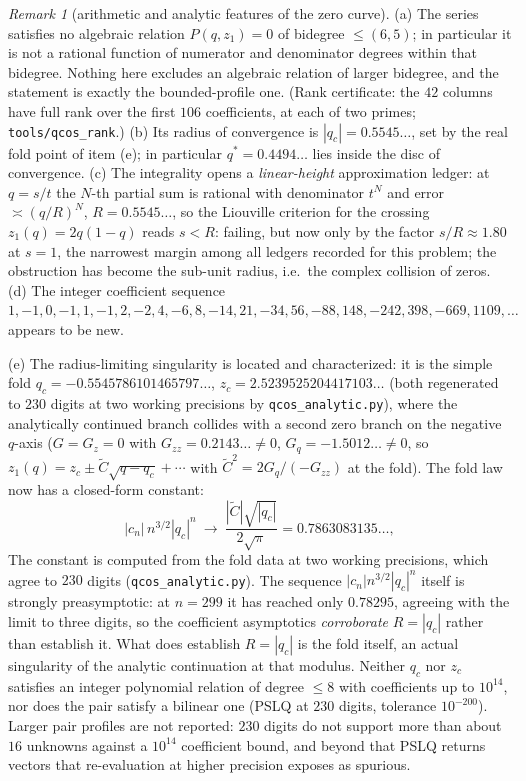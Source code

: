\documentclass[11pt]{article}
\theoremstyle{plain}
\theoremstyle{definition}
\theoremstyle{remark}
\newtheorem{remark}[theorem]{Remark}
\begin{document}
\begin{remark}[arithmetic and analytic features of the zero curve]\label{rem:zerocurve-arith}
(a) The series satisfies no algebraic relation $P(q,z_1)=0$ of bidegree $\le(6,5)$; in particular
it is not a rational function of numerator and denominator degrees within that bidegree. Nothing
here excludes an algebraic relation of larger bidegree, and the statement is exactly the
bounded-profile one. \textup{(Rank certificate: the $42$ columns have full rank over the first
$106$ coefficients, at each of two primes; \texttt{tools/qcos\_rank}.)} (b) Its radius of
convergence is
$|q_c|=0.5545\ldots$, set by the real fold point of item (e); in particular
$q^\ast=0.4494\ldots$ lies inside the disc of convergence. (c) The
integrality opens a \emph{linear-height} approximation ledger: at $q=s/t$ the $N$-th partial sum is
rational with denominator $t^N$ and error $\asymp(q/R)^N$, $R=0.5545\ldots$, so the Liouville
criterion for the crossing $z_1(q)=2q(1-q)$ reads $s<R$: failing, but now only by the factor
$s/R\approx1.80$ at $s=1$, the narrowest margin among all ledgers recorded for this problem; the
obstruction has become the sub-unit radius, i.e.\ the complex collision of zeros. (d) The integer
coefficient sequence $1,-1,0,-1,1,-1,2,-2,4,-6,8,-14,21,-34,56,-88,148,-242,398,-669,1109,\dots$
appears to be new.

(e) The radius-limiting singularity is located and characterized: it is the simple fold
$q_c=-0.5545786101465797\ldots$, $z_c=2.5239525204417103\ldots$ (both regenerated to $230$
digits at two working precisions by \texttt{qcos\_analytic.py}), where the analytically continued branch collides with a second zero branch on the
negative $q$-axis ($G=G_z=0$ with $G_{zz}=0.2143\ldots\ne0$, $G_q=-1.5012\ldots\ne0$, so
$z_1(q)=z_c\pm\tilde C\sqrt{q-q_c}+\cdots$ with $\tilde C^2=2G_q/(-G_{zz})$ at the fold). The
fold law now has a closed-form constant:
\[
   |c_n|\,n^{3/2}|q_c|^n\ \longrightarrow\ \frac{|\tilde C|\sqrt{|q_c|}}{2\sqrt\pi}
   =0.7863083135\ldots,
\]
The constant is computed from the fold data at two working precisions, which agree to $230$
digits (\texttt{qcos\_analytic.py}). The sequence $|c_n|n^{3/2}|q_c|^n$ itself is strongly preasymptotic:
at $n=299$ it has reached only $0.78295$, agreeing with the limit to three digits, so the
coefficient asymptotics \emph{corroborate} $R=|q_c|$ rather than establish it. What does establish
$R=|q_c|$ is the fold itself, an actual singularity of the analytic continuation at that modulus.
Neither
$q_c$ nor $z_c$ satisfies an integer polynomial relation of degree $\le8$ with coefficients up to
$10^{14}$, nor does the pair satisfy a bilinear one (PSLQ at $230$ digits, tolerance $10^{-200}$).
Larger pair profiles are not reported: $230$ digits do not support more than about $16$ unknowns
against a $10^{14}$ coefficient bound, and beyond that PSLQ returns vectors that re-evaluation at
higher precision exposes as spurious.


\end{remark}
\end{document}
